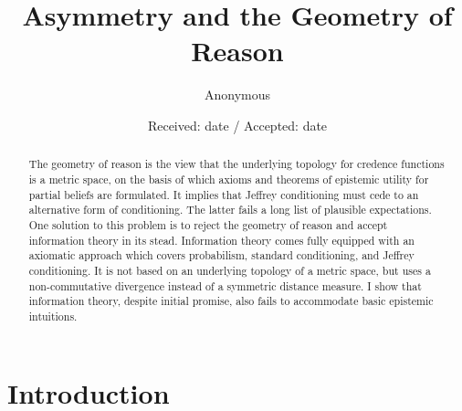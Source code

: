 \documentclass[smallextended]{svjour3}       %
\begin{document}
\title{Asymmetry and the Geometry of Reason}


\author{Anonymous}



\date{Received: date / Accepted: date}

\maketitle

\begin{abstract}
  {\noindent}The geometry of reason is the view that the underlying
  topology for credence functions is a metric space, on the basis of
  which axioms and theorems of epistemic utility for partial beliefs
  are formulated. It implies that Jeffrey conditioning must cede to an
  alternative form of conditioning. The latter fails a long list of
  plausible expectations. One solution to this problem is to reject
  the geometry of reason and accept information theory in its stead.
  Information theory comes fully equipped with an axiomatic approach
  which covers probabilism, standard conditioning, and Jeffrey
  conditioning. It is not based on an underlying topology of a metric
  space, but uses a non-commutative divergence instead of a symmetric
  distance measure. I show that information theory, despite initial
  promise, also fails to accommodate basic epistemic intuitions.
\end{abstract}

\section{Introduction}
\label{intr}
\end{document}
